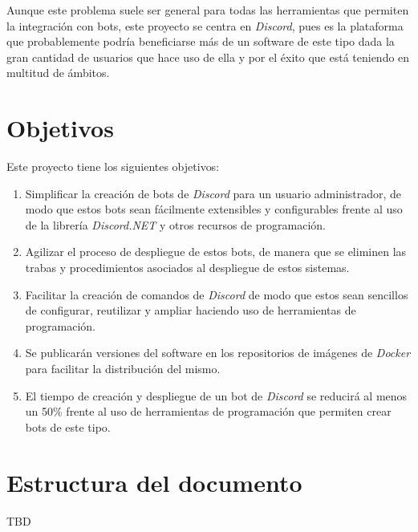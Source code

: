 Aunque este problema suele ser general para todas las herramientas que permiten la integración con bots, este proyecto se centra en \textit{Discord}, pues es la plataforma que probablemente podría beneficiarse más de un software de este tipo dada la gran cantidad de usuarios que hace uso de ella y por el éxito\cite{enlyft} que está teniendo en multitud de ámbitos.

\section{Objetivos}

Este proyecto tiene los siguientes objetivos:

\begin{enumerate}
	\item Simplificar la creación de bots de \textit{Discord} para un usuario administrador, de modo que estos bots sean fácilmente extensibles y configurables frente al uso de la librería \textit{Discord.NET} y otros recursos de programación.
	\item Agilizar el proceso de despliegue de estos bots, de manera que se eliminen las trabas y procedimientos asociados al despliegue de estos sistemas.
	\item Facilitar la creación de comandos de \textit{Discord} de modo que estos sean sencillos de configurar, reutilizar y ampliar haciendo uso de herramientas de programación.
	\item Se publicarán versiones del software en los repositorios de imágenes de \textit{Docker} para facilitar la distribución del mismo.
	\item El tiempo de creación y despliegue de un bot de \textit{Discord} se reducirá al menos un 50\% frente al uso de herramientas de programación que permiten crear bots de este tipo.
\end{enumerate}

\section{Estructura del documento}

TBD
